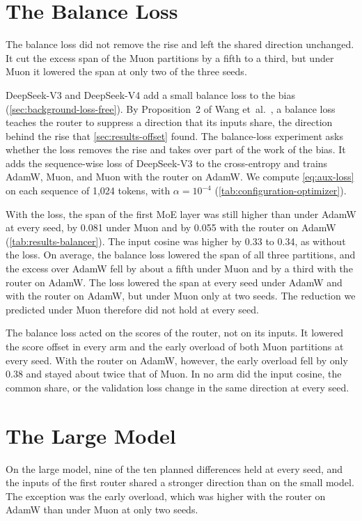\section{The Balance Loss}
\label{sec:results-balance-loss}
The balance loss did not remove the rise and left the shared direction unchanged. It cut the excess span of the Muon partitions by a fifth to a third, but under Muon it lowered the span at only two of the three seeds.

DeepSeek-V3 and DeepSeek-V4 add a small balance loss to the bias (\cref{sec:background-loss-free}). By Proposition~2 of Wang et~al.~\cite{wang2026myth}, a balance loss teaches the router to suppress a direction that its inputs share, the direction behind the rise that \cref{sec:results-offset} found. The balance-loss experiment asks whether the loss removes the rise and takes over part of the work of the bias. It adds the sequence-wise loss of DeepSeek-V3 \cite{deepseek2024v3} to the cross-entropy and trains AdamW, Muon, and Muon with the router on AdamW\@. We compute \cref{eq:aux-loss} on each sequence of 1,024 tokens, with $\alpha = 10^{-4}$ (\cref{tab:configuration-optimizer}).

With the loss, the span of the first MoE layer was still higher than under AdamW at every seed, by 0.081 under Muon and by 0.055 with the router on AdamW (\cref{tab:results-balancer}). The input cosine was higher by 0.33 to 0.34, as without the loss. On average, the balance loss lowered the span of all three partitions, and the excess over AdamW fell by about a fifth under Muon and by a third with the router on AdamW\@. The loss lowered the span at every seed under AdamW and with the router on AdamW, but under Muon only at two seeds. The reduction we predicted under Muon therefore did not hold at every seed.

The balance loss acted on the scores of the router, not on its inputs. It lowered the score offset in every arm and the early overload of both Muon partitions at every seed. With the router on AdamW, however, the early overload fell by only 0.38 and stayed about twice that of Muon. In no arm did the input cosine, the common share, or the validation loss change in the same direction at every seed.

\section{The Large Model}
\label{sec:results-large}
On the large model, nine of the ten planned differences held at every seed, and the inputs of the first router shared a stronger direction than on the small model. The exception was the early overload, which was higher with the router on AdamW than under Muon at only two seeds.

